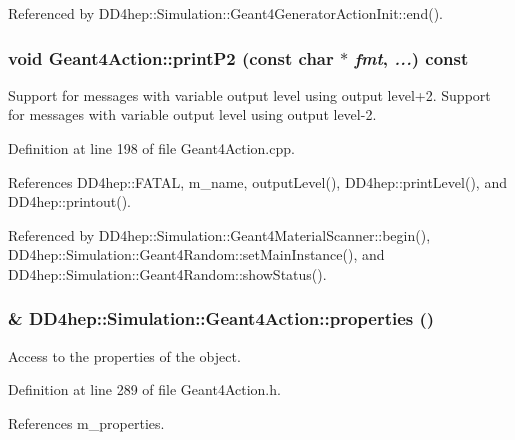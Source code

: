 Referenced by DD4hep::Simulation::Geant4GeneratorActionInit::end().\hypertarget{class_d_d4hep_1_1_simulation_1_1_geant4_action_a03ed6b722207ae7b656bf19c8e070fba}{
\subsubsection[{printP2}]{\setlength{\rightskip}{0pt plus 5cm}void Geant4Action::printP2 (const char $\ast$ {\em fmt}, \/   {\em ...}) const}}
\label{class_d_d4hep_1_1_simulation_1_1_geant4_action_a03ed6b722207ae7b656bf19c8e070fba}


Support for messages with variable output level using output level+2. Support for messages with variable output level using output level-\/2. 

Definition at line 198 of file Geant4Action.cpp.

References DD4hep::FATAL, m\_\-name, outputLevel(), DD4hep::printLevel(), and DD4hep::printout().

Referenced by DD4hep::Simulation::Geant4MaterialScanner::begin(), DD4hep::Simulation::Geant4Random::setMainInstance(), and DD4hep::Simulation::Geant4Random::showStatus().\hypertarget{class_d_d4hep_1_1_simulation_1_1_geant4_action_a4159b11cc0acd293357e80980e3ba7d8}{
\subsubsection[{properties}]{\& DD4hep::Simulation::Geant4Action::properties ()}}
\label{class_d_d4hep_1_1_simulation_1_1_geant4_action_a4159b11cc0acd293357e80980e3ba7d8}


Access to the properties of the object. 

Definition at line 289 of file Geant4Action.h.

References m\_\-properties.

